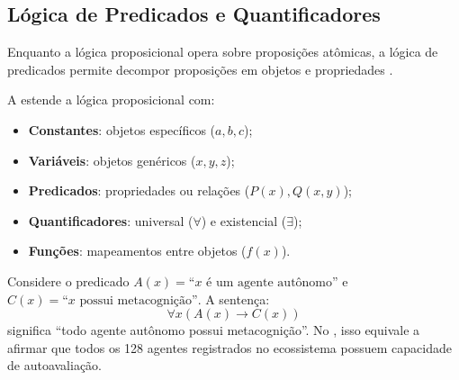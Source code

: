\subsection{Lógica de Predicados e Quantificadores}
Enquanto a lógica proposicional opera sobre proposições atômicas, a lógica
de predicados permite decompor proposições em objetos e propriedades
\cite{russell2020inteligencia, wooldridge2009multiagent}.
\begin{definicao}
A  estende a lógica proposicional com:
\begin{itemize}
\item \textbf{Constantes}: objetos específicos ($a, b, c$);
\item \textbf{Variáveis}: objetos genéricos ($x, y, z$);
\item \textbf{Predicados}: propriedades ou relações ($P(x), Q(x,y)$);
\item \textbf{Quantificadores}: universal ($\forall$) e existencial
($\exists$);
\item \textbf{Funções}: mapeamentos entre objetos ($f(x)$).
\end{itemize}
\end{definicao}
\begin{exemplo}
Considere o predicado $A(x) = \text{``}x\text{ é um agente autônomo''}$ e
$C(x) = \text{``}x\text{ possui metacognição''}$. A sentença:
\[\forall x (A(x) \to C(x))
\]
significa ``todo agente autônomo possui metacognição''. No \opencodeeco,
isso equivale a afirmar que todos os 128 agentes registrados no
ecossistema possuem capacidade de autoavaliação.
\end{exemplo}
